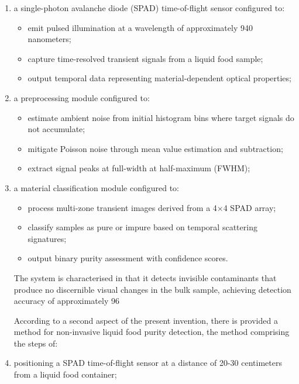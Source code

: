 \documentclass[11pt,a4paper]{article}
\begin{document}
\begin{enumerate}[leftmargin=*,label=\alph*)]
\item a single-photon avalanche diode (SPAD) time-of-flight sensor configured to:
\begin{itemize}[leftmargin=*]
\item emit pulsed illumination at a wavelength of approximately 940 nanometers;
\item capture time-resolved transient signals from a liquid food sample;
\item output temporal data representing material-dependent optical properties;
\end{itemize}

\item a preprocessing module configured to:
\begin{itemize}[leftmargin=*]
\item estimate ambient noise from initial histogram bins where target signals do not accumulate;
\item mitigate Poisson noise through mean value estimation and subtraction;
\item extract signal peaks at full-width at half-maximum (FWHM);
\end{itemize}

\item a material classification module configured to:
\begin{itemize}[leftmargin=*]
\item process multi-zone transient images derived from a 4$\times$4 SPAD array;
\item classify samples as pure or impure based on temporal scattering signatures;
\item output binary purity assessment with confidence scores.
\end{itemize}

The system is characterised in that it detects invisible contaminants that produce no discernible visual changes in the bulk sample, achieving detection accuracy of approximately 96%

According to a second aspect of the present invention, there is provided a method for non-invasive liquid food purity detection, the method comprising the steps of:

\item positioning a SPAD time-of-flight sensor at a distance of 20-30 centimeters from a liquid food container;


\end{enumerate}
\end{document}

